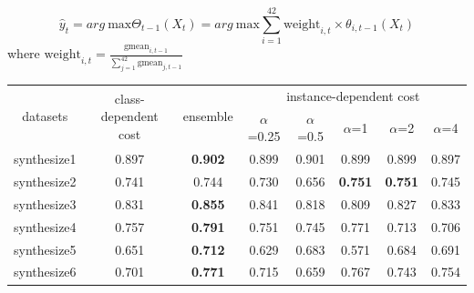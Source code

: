 \documentclass{article}
\begin{document}
$$\hat{y}_t =arg\ \text{max} \Theta_{t-1}(X_t)=arg\ \text{max} \sum_{i=1}^{42} \text{weight}_{i,t} \times \theta_{i,t-1}(X_t)$$
where $\text{weight}_{i,t}=\frac{\text{gmean}_{i,t-1}}{\sum_{j=1}^{42}\text{gmean}_{j,t-1}}$ 

\begin{table}[!ht]
	\centering
	\begin{tabular}{|c||c|c|ccccc|}
		\hline
		\multirow{2}{*}{datasets} & \multirow{2}{*}{class-dependent cost}  & \multirow{2}{*}{ensemble} & \multicolumn{5}{c|}{instance-dependent cost}                                                                                                                           \\ \cline{4-8} 
		&          &                             & \multicolumn{1}{c|}{$\alpha$=0.25}         & \multicolumn{1}{c|}{$\alpha$=0.5}          & \multicolumn{1}{c|}{$\alpha$=1}            & \multicolumn{1}{c|}{$\alpha$=2}            & $\alpha$=4            \\ \hline \hline
		synthesize1               & 0.897     & \textbf{0.902}                             & \multicolumn{1}{c|}{0.899}          & \multicolumn{1}{c|}{0.901} & \multicolumn{1}{c|}{0.899}          & \multicolumn{1}{c|}{0.899}          & 0.897          \\ \hline
		synthesize2               & 0.741     & 0.744                             & \multicolumn{1}{c|}{0.730}          & \multicolumn{1}{c|}{0.656}          & \multicolumn{1}{c|}{\textbf{0.751}} & \multicolumn{1}{c|}{\textbf{0.751}} & 0.745          \\ \hline
		synthesize3               & 0.831      & \textbf{0.855}                              & \multicolumn{1}{c|}{0.841} & \multicolumn{1}{c|}{0.818}          & \multicolumn{1}{c|}{0.809}          & \multicolumn{1}{c|}{0.827}          & 0.833          \\ \hline
		synthesize4               & 0.757         & \textbf{0.791}                          & \multicolumn{1}{c|}{0.751}          & \multicolumn{1}{c|}{0.745}          & \multicolumn{1}{c|}{0.771} & \multicolumn{1}{c|}{0.713}          & 0.706          \\ \hline
		synthesize5               & 0.651         & \textbf{0.712}                           & \multicolumn{1}{c|}{0.629}          & \multicolumn{1}{c|}{0.683}          & \multicolumn{1}{c|}{0.571}          & \multicolumn{1}{c|}{0.684}          & 0.691 \\ \hline
		synthesize6               & 0.701         & \textbf{0.771}                           & \multicolumn{1}{c|}{0.715}          & \multicolumn{1}{c|}{0.659}          & \multicolumn{1}{c|}{0.767} & \multicolumn{1}{c|}{0.743}          & 0.754          \\ \hline

\end{tabular}
\end{table}
\end{document}

